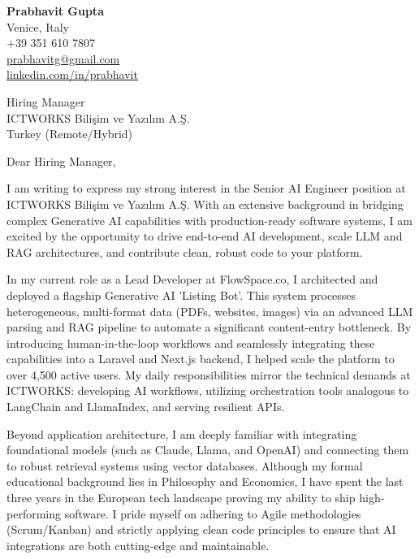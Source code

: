 \documentclass[11pt,a4paper]{article}
\begin{document}
\pagestyle{empty}

\begin{flushleft}
\textbf{Prabhavit Gupta} \\
Venice, Italy \\
+39 351 610 7807 \\
\href{mailto:prabhavitg@gmail.com}{prabhavitg@gmail.com} \\
\href{https://linkedin.com/in/prabhavit}{linkedin.com/in/prabhavit}
\end{flushleft}

\vspace{20pt}

\begin{flushleft}
Hiring Manager \\
ICTWORKS Bilişim ve Yazılım A.Ş. \\
Turkey (Remote/Hybrid)
\end{flushleft}

\vspace{20pt}

Dear Hiring Manager,

\vspace{10pt}

I am writing to express my strong interest in the Senior AI Engineer position at ICTWORKS Bilişim ve Yazılım A.Ş. With an extensive background in bridging complex Generative AI capabilities with production-ready software systems, I am excited by the opportunity to drive end-to-end AI development, scale LLM and RAG architectures, and contribute clean, robust code to your platform. 

In my current role as a Lead Developer at FlowSpace.co, I architected and deployed a flagship Generative AI 'Listing Bot'. This system processes heterogeneous, multi-format data (PDFs, websites, images) via an advanced LLM parsing and RAG pipeline to automate a significant content-entry bottleneck. By introducing human-in-the-loop workflows and seamlessly integrating these capabilities into a Laravel and Next.js backend, I helped scale the platform to over 4,500 active users. My daily responsibilities mirror the technical demands at ICTWORKS: developing AI workflows, utilizing orchestration tools analogous to LangChain and LlamaIndex, and serving resilient APIs.

Beyond application architecture, I am deeply familiar with integrating foundational models (such as Claude, Llama, and OpenAI) and connecting them to robust retrieval systems using vector databases. Although my formal educational background lies in Philosophy and Economics, I have spent the last three years in the European tech landscape proving my ability to ship high-performing software. I pride myself on adhering to Agile methodologies (Scrum/Kanban) and strictly applying clean code principles to ensure that AI integrations are both cutting-edge and maintainable.
\end{document}
